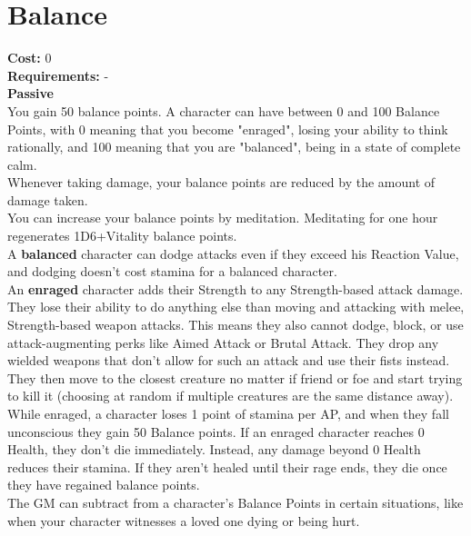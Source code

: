 \section{Balance}
\textbf{Cost:} 0\\
\textbf{Requirements:} -\\
\textbf{Passive}\\
You gain 50 balance points. A character can have between 0 and 100 Balance Points, with 0 meaning that you become "enraged", losing your ability to think rationally, and 100 meaning that you are "balanced", being in a state of complete calm.\\
Whenever taking damage, your balance points are reduced by the amount of damage taken.\\
You can increase your balance points by meditation. Meditating for one hour regenerates 1D6+Vitality balance points.\\
A \textbf{balanced} character can dodge attacks even if they exceed his Reaction Value, and dodging doesn't cost stamina for a balanced character.\\
An \textbf{enraged} character adds their Strength to any Strength-based attack damage. They lose their ability to do anything else than moving and attacking with melee, Strength-based weapon attacks. This means they also cannot dodge, block, or use attack-augmenting perks like Aimed Attack or Brutal Attack. They drop any wielded weapons that don't allow for such an attack and use their fists instead. They then move to the closest creature no matter if friend or foe and start trying to kill it (choosing at random if multiple creatures are the same distance away). While enraged, a character loses 1 point of stamina per AP, and when they fall unconscious they gain 50 Balance points. If an enraged character reaches 0 Health, they don't die immediately. Instead, any damage beyond 0 Health reduces their stamina. If they aren't healed until their rage ends, they die once they have regained balance points.\\
The GM can subtract from a character's Balance Points in certain situations, like when your character witnesses a loved one dying or being hurt.
